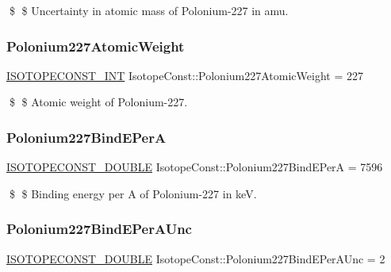 \$ \$ Uncertainty in atomic mass of Polonium-\/227 in amu. \mbox{\label{group___isotope_const-_polonium-_po227_ga7f6dab608eda0953df2840e2904a7cc3}} 
\subsubsection{\texorpdfstring{Polonium227\+Atomic\+Weight}{Polonium227AtomicWeight}}
{\footnotesize\ttfamily \mbox{\hyperlink{group___isotope_const-_macros_ga5f18360b3e99483a35c32d789e62621c}{I\+S\+O\+T\+O\+P\+E\+C\+O\+N\+S\+T\+\_\+\+I\+NT}} Isotope\+Const\+::\+Polonium227\+Atomic\+Weight = 227}

\$ \$ Atomic weight of Polonium-\/227. \mbox{\label{group___isotope_const-_polonium-_po227_ga6d5a9628fa2e15d2aff128f9ca222269}} 
\subsubsection{\texorpdfstring{Polonium227\+Bind\+E\+PerA}{Polonium227BindEPerA}}
{\footnotesize\ttfamily \mbox{\hyperlink{group___isotope_const-_macros_ga8f45a7272ce02c0b4c65c44636ed719a}{I\+S\+O\+T\+O\+P\+E\+C\+O\+N\+S\+T\+\_\+\+D\+O\+U\+B\+LE}} Isotope\+Const\+::\+Polonium227\+Bind\+E\+PerA = 7596}

\$ \$ Binding energy per A of Polonium-\/227 in keV. \mbox{\label{group___isotope_const-_polonium-_po227_ga0a84c617e474505cbf7cbb2947b7b306}} 
\subsubsection{\texorpdfstring{Polonium227\+Bind\+E\+Per\+A\+Unc}{Polonium227BindEPerAUnc}}
{\footnotesize\ttfamily \mbox{\hyperlink{group___isotope_const-_macros_ga8f45a7272ce02c0b4c65c44636ed719a}{I\+S\+O\+T\+O\+P\+E\+C\+O\+N\+S\+T\+\_\+\+D\+O\+U\+B\+LE}} Isotope\+Const\+::\+Polonium227\+Bind\+E\+Per\+A\+Unc = 2}

